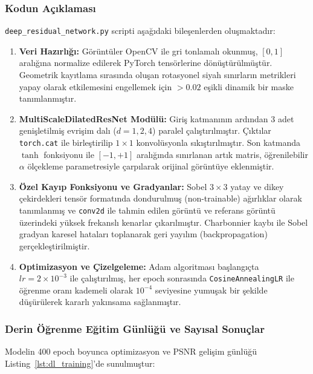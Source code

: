 \documentclass[12pt,a4paper]{article}
\begin{document}
\subsubsection{Kodun Açıklaması}
\texttt{deep\_residual\_network.py} scripti aşağıdaki bileşenlerden oluşmaktadır:
\begin{enumerate}
    \item \textbf{Veri Hazırlığı:} Görüntüler OpenCV ile gri tonlamalı okunmuş, $[0, 1]$ aralığına normalize edilerek PyTorch tensörlerine dönüştürülmüştür. Geometrik kayıtlama sırasında oluşan rotasyonel siyah sınırların metrikleri yapay olarak etkilemesini engellemek için $>0.02$ eşikli dinamik bir maske tanımlanmıştır.
    \item \textbf{MultiScaleDilatedResNet Modülü:} Giriş katmanının ardından 3 adet genişletilmiş evrişim dalı ($d=1, 2, 4$) paralel çalıştırılmıştır. Çıktılar \texttt{torch.cat} ile birleştirilip $1\times 1$ konvolüsyonla sıkıştırılmıştır. Son katmanda $\tanh$ fonksiyonu ile $[-1, +1]$ aralığında sınırlanan artık matris, öğrenilebilir $\alpha$ ölçekleme parametresiyle çarpılarak orijinal görüntüye eklenmiştir.
    \item \textbf{Özel Kayıp Fonksiyonu ve Gradyanlar:} Sobel $3\times 3$ yatay ve dikey çekirdekleri tensör formatında dondurulmuş (non-trainable) ağırlıklar olarak tanımlanmış ve \texttt{conv2d} ile tahmin edilen görüntü ve referans görüntü üzerindeki yüksek frekanslı kenarlar çıkarılmıştır. Charbonnier kaybı ile Sobel gradyan karesel hataları toplanarak geri yayılım (backpropagation) gerçekleştirilmiştir.
    \item \textbf{Optimizasyon ve Çizelgeleme:} Adam algoritması başlangıçta $lr = 2\times 10^{-3}$ ile çalıştırılmış, her epoch sonrasında \texttt{CosineAnnealingLR} ile öğrenme oranı kademeli olarak $10^{-4}$ seviyesine yumuşak bir şekilde düşürülerek kararlı yakınsama sağlanmıştır.
\end{enumerate}

\newpage
\subsubsection{Derin Öğrenme Eğitim Günlüğü ve Sayısal Sonuçlar}
Modelin 400 epoch boyunca optimizasyon ve PSNR gelişim günlüğü Listing~\ref{lst:dl_training}'de sunulmuştur:
\end{document}
